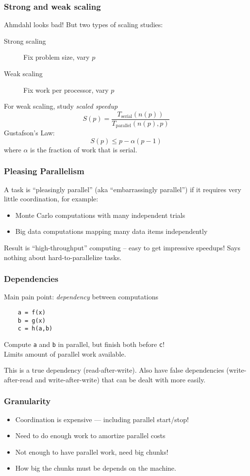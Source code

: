 \documentclass{beamer}
\begin{document}
\begin{frame}
  \frametitle{Strong and weak scaling}

  Ahmdahl looks bad!  But two types of scaling studies:
  \begin{description}
  \item[Strong scaling] Fix problem size, vary $p$
  \item[Weak scaling] Fix work per processor, vary $p$
  \end{description}

  \vspace{5mm}
  For weak scaling, study {\em scaled speedup}
  \[
    S(p) =
    \frac{T_{\mbox{serial}}(n(p))}{T_{\mbox{parallel}}(n(p), p)}
  \]
  Gustafson's Law:
  \[
    S(p) \leq p - \alpha(p-1)
  \]
  where $\alpha$ is the fraction of work that is serial.
\end{frame}


\begin{frame}
  \frametitle{Pleasing Parallelism}

  A task is ``pleasingly parallel'' (aka ``embarrassingly parallel'')
  if it requires very little coordination, for example:
  \begin{itemize}
  \item Monte Carlo computations with many independent trials
  \item Big data computations mapping many data items independently
  \end{itemize}
  Result is ``high-throughput'' computing -- easy to get impressive
  speedups!  Says nothing about hard-to-parallelize tasks.

\end{frame}


\begin{frame}[fragile]
  \frametitle{Dependencies}

  Main pain point: {\em dependency} between computations
  \begin{lstlisting}
    a = f(x)
    b = g(x)
    c = h(a,b)
  \end{lstlisting}
  Compute {\tt a} and {\tt b} in parallel, but finish both
  before {\tt c}! \\
  Limits amount of parallel work available.

  This is a true dependency (read-after-write).  Also have false
  dependencies (write-after-read and write-after-write) that can be
  dealt with more easily.
\end{frame}


\begin{frame}
  \frametitle{Granularity}

  \begin{itemize}
  \item Coordination is expensive --- including parallel start/stop!
  \item Need to do enough work to amortize parallel costs
  \item Not enough to have parallel work, need big chunks!
  \item How big the chunks must be depends on the machine.
  \end{itemize}
\end{frame}
\end{document}
